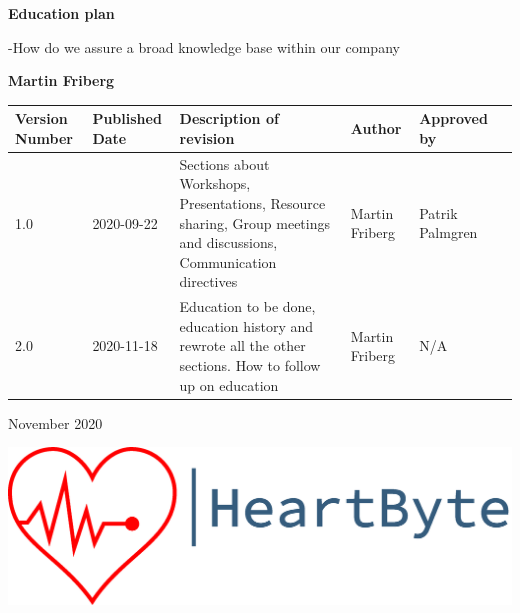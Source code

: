 \begin{titlepage}
   \begin{center}
       \vspace*{1cm}
        \Huge
       \textbf{Education plan}
        
        \Large
       \vspace{0.5cm}
        -How do we assure a broad knowledge base within our company
            
       \vspace{1.5cm}

       \textbf{Martin Friberg}
\begin{center}
\tiny
\begin{tabular}{ | m{5em} | m{5em}| m{10em} |m{5em}| m{5em} |m{5em} |  } 
\hline
Version Number& Published Date & Description of revision & Author & Approved by \\ 
\hline
1.0 & 2020-09-22 & Sections about Workshops, Presentations, Resource sharing, Group meetings and discussions, Communication directives & Martin Friberg & Patrik Palmgren \\
\hline
2.0 & 2020-11-18 & Education to be done, education history and rewrote all the other sections. How to follow up on education & Martin Friberg & N/A \\
\hline


\end{tabular}
\end{center}

     \vspace{1cm}
     
    \small November 2020
     


      \vfill
\includegraphics[width=\linewidth]{Pictures/logo_heartbyte_transparent_v_1_1 (1)}

    \vfill
            
   \end{center}
\end{titlepage}